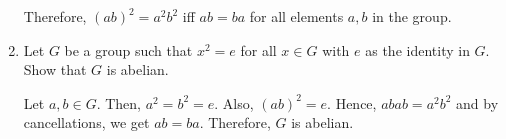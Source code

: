 \begin{example}[Seatwork]
\begin{enumerate}
\begin{itemize}
            \end{itemize}
            Therefore, \((ab)^2 = a^2b^2\) iff \(ab = ba\) for all elements \(a, b\) in the group.

            \item Let \(G\) be a group such that \(x^2 = e\) for all \(x\in G\) with \(e\) as the identity in \(G\). Show that \(G\) is abelian.

            Let \(a, b\in G\). Then, \(a^2 = b^2 = e\). Also, \((ab)^2 = e\). Hence, \(abab = a^2b^2\) and by cancellations, we get \(ab = ba\). Therefore, \(G\) is abelian.
        \end{enumerate}
    \end{example}
